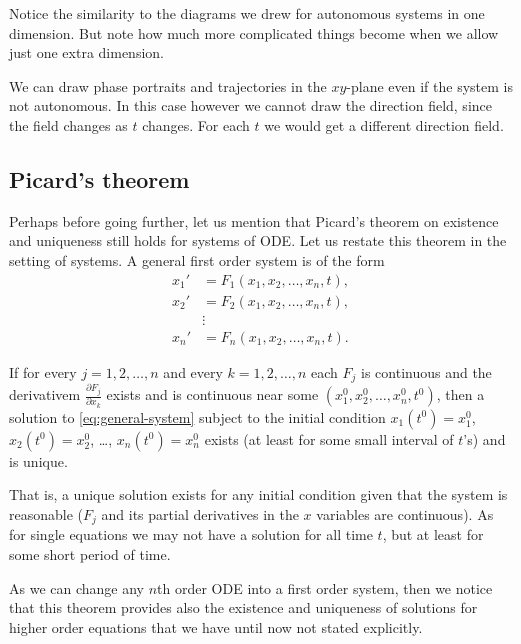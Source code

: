 \documentclass{ximera}
\begin{document}
Notice the similarity to the diagrams we drew for autonomous systems in one dimension.  But note how much more complicated things become when we allow just one extra dimension.

We can draw phase portraits and trajectories in the $xy$-plane even if the system is not autonomous.  In this case however we cannot draw the direction field, since the field changes as $t$ changes.  For each $t$ we would get a different direction field.

\subsection{Picard's theorem}

Perhaps before going further, let us mention that Picard's theorem on existence and uniqueness still holds for systems of ODE\@.  Let us restate this theorem in the setting of systems.  A general first order system is of the form
\begin{equation} \label{eq:general-system}
    \begin{aligned}
        x_1' & = F_1(x_1,x_2,\ldots,x_n,t) , \\
        x_2' & = F_2(x_1,x_2,\ldots,x_n,t) , \\
        & \vdots \\
        x_n' & = F_n(x_1,x_2,\ldots,x_n,t) .
    \end{aligned}
\end{equation}

\begin{theorem}%
    \label{sys:picardthm}
     If for every $j=1,2,\ldots,n$ and every $k = 1,2,\ldots,n$ each $F_j$ is continuous and the derivativem $\frac{\partial F_j}{\partial x_k}$ exists and is continuous near some $(x_1^0,x_2^0,\ldots,x_n^0,t^0)$, then a solution to \eqref{eq:general-system} subject to the initial condition
    $x_1(t^0) = x_1^0$, $x_2(t^0) = x_2^0$, \ldots, $x_n(t^0) = x_n^0$
    exists (at least for some small interval of $t$'s) and is unique.
\end{theorem}

That is, a unique solution exists for any initial condition given that the system is reasonable ($F_j$ and its partial derivatives in the $x$ variables are continuous).  As for single equations we may not have a solution for all time $t$, but at least for some short period of time.

As we can change any $n$th order ODE into a first order system, then we notice that this theorem provides also the existence and uniqueness of solutions for higher order equations that we have until now not stated explicitly.
\end{document}
